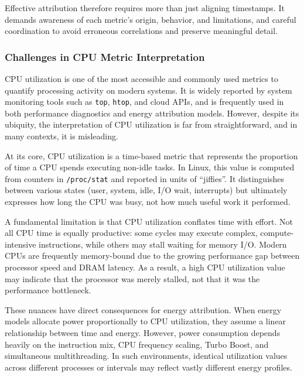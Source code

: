 Effective attribution therefore requires more than just aligning timestamps. It demands awareness of each metric’s origin, behavior, and limitations, and careful coordination to avoid erroneous correlations and preserve meaningful detail.

\subsubsection{Challenges in CPU Metric Interpretation}
\label{sec:cpu-metric-challenges}

CPU utilization is one of the most accessible and commonly used metrics to quantify processing activity on modern systems. It is widely reported by system monitoring tools such as \texttt{top}, \texttt{htop}, and cloud APIs, and is frequently used in both performance diagnostics and energy attribution models. However, despite its ubiquity, the interpretation of CPU utilization is far from straightforward, and in many contexts, it is misleading.

At its core, CPU utilization is a time-based metric that represents the proportion of time a CPU spends executing non-idle tasks. In Linux, this value is computed from counters in \texttt{/proc/stat} and reported in units of ``jiffies''. It distinguishes between various states (user, system, idle, I/O wait, interrupts) but ultimately expresses how long the CPU was busy, not how much useful work it performed\parencite{Tarara2023CpuUtilization}.

A fundamental limitation is that CPU utilization conflates time with effort. Not all CPU time is equally productive: some cycles may execute complex, compute-intensive instructions, while others may stall waiting for memory I/O. Modern CPUs are frequently memory-bound due to the growing performance gap between processor speed and DRAM latency. As a result, a high CPU utilization value may indicate that the processor was merely stalled, not that it was the performance bottleneck\parencite{Gregg2017CpuUtilizationWrong}.

These nuances have direct consequences for energy attribution. When energy models allocate power proportionally to CPU utilization, they assume a linear relationship between time and energy. However, power consumption depends heavily on the instruction mix, CPU frequency scaling, Turbo Boost, and simultaneous multithreading. In such environments, identical utilization values across different processes or intervals may reflect vastly different energy profiles.

